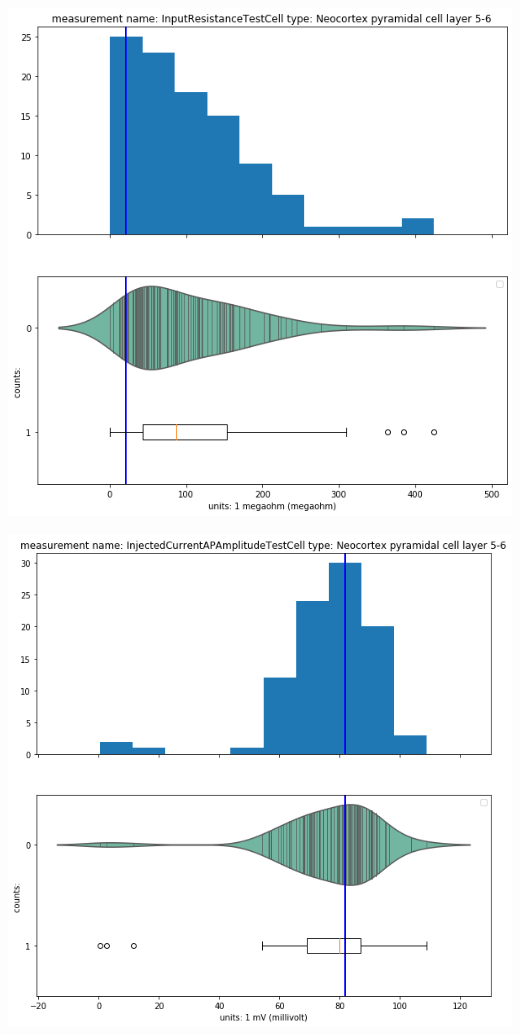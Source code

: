     \begin{center}
   \includegraphics[width=0.7\linewidth]{notebooks_converted/needata_thesis_files/needata_thesis_5_13}
    \end{center}
    \begin{center}
    \includegraphics[width=0.7\linewidth]{notebooks_converted/needata_thesis_files/needata_thesis_5_16}
    \end{center}

